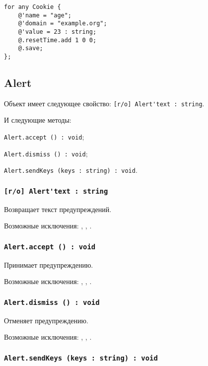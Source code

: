 \begin{lstlisting}[caption=Создания новых cookie, label=newcookies]
for any Cookie {
	@'name = "age";
	@'domain = "example.org";
	@'value = 23 : string;
	@.resetTime.add 1 0 0;
	@.save;
};
\end{lstlisting}


\subsection{{\color{orange} Alert}}

Объект \alert{} имеет следующее свойство: \lstinline|[r/o] Alert'text : string|.

И следующие методы:
\begin{icItems}
	\item \lstinline|Alert.accept () : void|;
	\item \lstinline|Alert.dismiss () : void|;
	\item \lstinline|Alert.sendKeys (keys : string) : void|.
\end{icItems}

\subsubsection{\lstinline|[r/o] Alert'text : string|}

Возвращает текст предупреждений.

Возможные исключения: , , .

\subsubsection{\lstinline|Alert.accept () : void|}

Принимает предупреждению.

Возможные исключения: , , .

\subsubsection{\lstinline|Alert.dismiss () : void|}

Отменяет предупреждению.

Возможные исключения: , , .

\subsubsection{\lstinline|Alert.sendKeys (keys : string) : void|}

